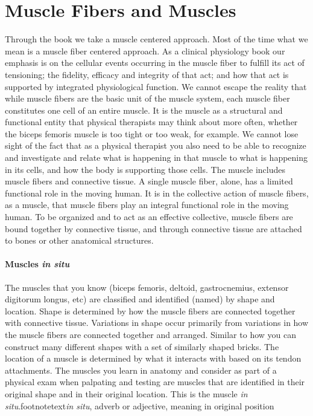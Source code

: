 \section{Muscle Fibers and Muscles}
Through the book we take a muscle centered approach. Most of the time what we mean is a muscle fiber centered approach. As a clinical physiology book our emphasis is on the cellular events occurring in the muscle fiber to fulfill its act of tensioning; the fidelity, efficacy and integrity of that act; and how that act is supported by integrated physiological function. We cannot escape the reality that while muscle fibers are the basic unit of the muscle system, each muscle fiber constitutes one cell of an entire muscle. It is the muscle as a structural and functional entity that physical therapists may think about more often, whether the biceps femoris muscle is too tight or too weak, for example. We cannot lose sight of the fact that as a physical therapist you also need to be able to recognize and investigate and relate what is happening in that muscle to what is happening in its cells, and how the body is supporting those cells. The muscle includes muscle fibers and connective tissue. A single muscle fiber, alone, has a limited functional role in the moving human. It is in the collective action of muscle fibers, as a muscle, that muscle fibers play an integral functional role in the moving human. To be organized and to act as an effective collective, muscle fibers are bound together by connective tissue, and through connective tissue are attached to bones or other anatomical structures. 

\paragraph{Muscles \textit{in situ}}
The muscles that you know (biceps femoris, deltoid, gastrocnemius, extensor digitorum longus, etc) are classified and identified (named) by shape and location. Shape is determined by how the muscle fibers are connected together with connective tissue. Variations in shape occur primarily from variations in how the muscle fibers are connected together and arranged. Similar to how you can construct many different shapes with a set of similarly shaped bricks. The location of a muscle is determined by what it interacts with based on its tendon attachments. The muscles you learn in anatomy and consider as part of a physical exam when palpating and testing are muscles that are identified in their original shape and in their original location. This is the muscle \textit{in situ}.\footnotemark{}footnotetext{\textit{in situ}, adverb or adjective, meaning in original position}

